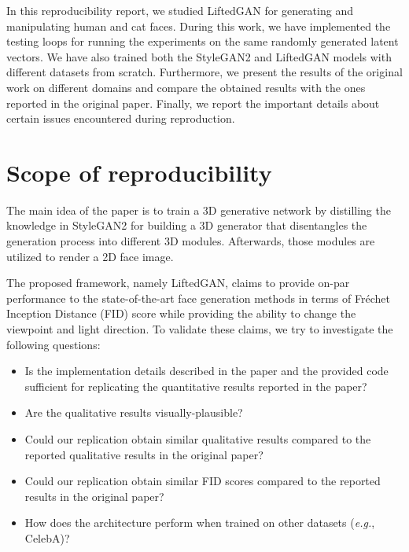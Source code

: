 In this reproducibility report, we studied LiftedGAN for generating and manipulating human and cat faces. During this work, we have implemented the testing loops for running the experiments on the same randomly generated latent vectors. We have also trained both the StyleGAN2 and LiftedGAN models with different datasets from scratch. Furthermore, we present the results of the original work on different domains and compare the obtained results with the ones reported in the original paper. Finally, we report the important details about certain issues encountered during reproduction.


\section{Scope of reproducibility}
\label{sec:claims}

The main idea of the paper is to train a 3D generative network by distilling the knowledge in StyleGAN2 for building a 3D generator that disentangles the generation process into different 3D modules. Afterwards, those modules are utilized to render a 2D face image.

The proposed framework, namely LiftedGAN, claims to provide on-par performance to the state-of-the-art face generation methods in terms of Fréchet Inception Distance (FID) \cite{heusel2018gans} score while providing the ability to change the viewpoint and light direction. To validate these claims, we try to investigate the following questions:
\begin{itemize}
    \item Is the implementation details described in the paper and the provided code sufficient for replicating the quantitative results reported in the paper?
    \item Are the qualitative results visually-plausible?
    \item Could our replication obtain similar qualitative results compared to the reported qualitative results in the original paper?
    \item Could our replication obtain similar FID scores compared to the reported results in the original paper?
    \item How does the architecture perform when trained on other datasets (\textit{e.g.}, CelebA)?
\end{itemize}


